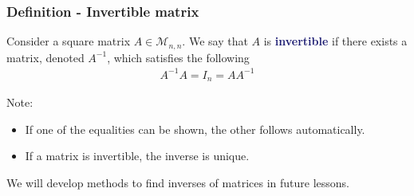 \documentclass[usenames,dvipsnames,aspectratio=169,10pt]{beamer}
\numberwithin{equation}{section}
\begin{document}
\begin{frame}
\frametitle{Definition - Invertible matrix}

Consider a square matrix $A \in\mathcal{M}_{n,n}$. We say that $A$ is \textbf{\textcolor{MidnightBlue}{invertible}} if there exists a matrix, denoted $A^{-1}$, which satisfies the following
\begin{align*}
A^{-1}A = I_n = AA^{-1}
\end{align*}

Note:
\begin{itemize}
\item If one of the equalities can be shown, the other follows automatically.
\item If a matrix is invertible, the inverse is unique.
\end{itemize}

We will develop methods to find inverses of matrices in future lessons.
\end{frame}
\end{document}
